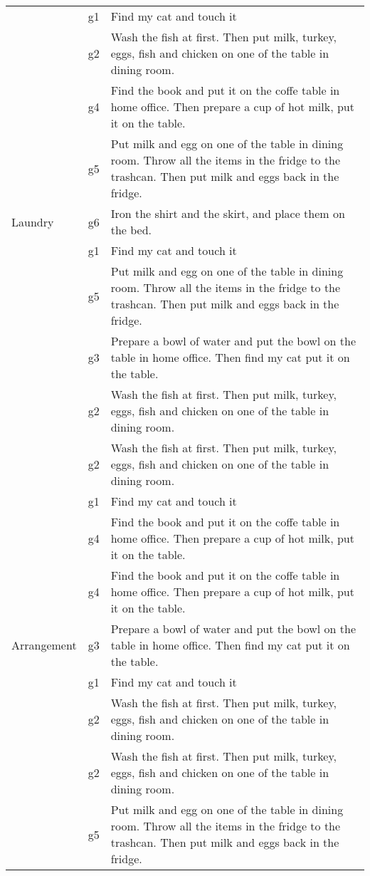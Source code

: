 \begin{table}[htbp]
\begin{tabular}{l|l|l}
 & g1 & Find my cat and touch it \\
 & g2 & Wash the fish at first. Then put milk, turkey, eggs, fish and chicken on one of the table in dining room. \\
 & g4 & Find the book and put it on the coffe table in home office. Then prepare a cup of hot milk, put it on the table. \\
 & g5 & Put milk and egg on one of the table in dining room. Throw all the items in the fridge to the trashcan. Then put milk and eggs back in the fridge. \\
Laundry & g6 & Iron the shirt and the skirt, and place them on the bed. \\
 & g1 & Find my cat and touch it \\
 & g5 & Put milk and egg on one of the table in dining room. Throw all the items in the fridge to the trashcan. Then put milk and eggs back in the fridge. \\
 & g3 & Prepare a bowl of water and put the bowl on the table in home office. Then find my cat put it on the table. \\
 & g2 & Wash the fish at first. Then put milk, turkey, eggs, fish and chicken on one of the table in dining room. \\
 & g2 & Wash the fish at first. Then put milk, turkey, eggs, fish and chicken on one of the table in dining room. \\
 & g1 & Find my cat and touch it \\
 & g4 & Find the book and put it on the coffe table in home office. Then prepare a cup of hot milk, put it on the table. \\
 & g4 & Find the book and put it on the coffe table in home office. Then prepare a cup of hot milk, put it on the table. \\
Arrangement & g3 & Prepare a bowl of water and put the bowl on the table in home office. Then find my cat put it on the table. \\
 & g1 & Find my cat and touch it \\
 & g2 & Wash the fish at first. Then put milk, turkey, eggs, fish and chicken on one of the table in dining room. \\
 & g2 & Wash the fish at first. Then put milk, turkey, eggs, fish and chicken on one of the table in dining room. \\
 & g5 & Put milk and egg on one of the table in dining room. Throw all the items in the fridge to the trashcan. Then put milk and eggs back in the fridge. \\

\end{tabular}
\end{table}
